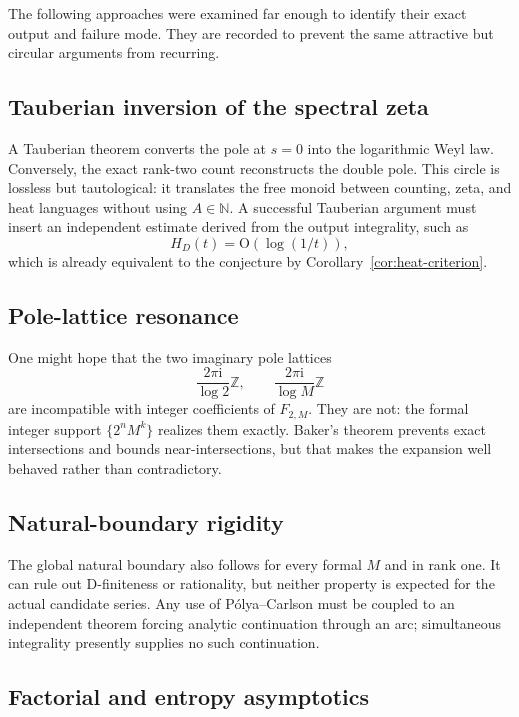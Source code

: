 \documentclass[11pt,oneside]{article}
\theoremstyle{definition}
\theoremstyle{remark}
\newcommand{\N}{\mathbb N}
\newcommand{\Z}{\mathbb Z}
\newcommand{\ii}{\mathrm i}
\newcommand{\bigO}{\mathrm O}
\begin{document}
The following approaches were examined far enough to identify their exact output and failure mode.  They are recorded to prevent the same attractive but circular arguments from recurring.

\subsection{Tauberian inversion of the spectral zeta}

A Tauberian theorem converts the pole at $s=0$ into the logarithmic Weyl law.  Conversely, the exact rank-two count reconstructs the double pole.  This circle is lossless but tautological: it translates the free monoid between counting, zeta, and heat languages without using $A\in\N$.  A successful Tauberian argument must insert an independent estimate derived from the output integrality, such as
\[
  H_D(t)=\bigO(\log(1/t)),
\]
which is already equivalent to the conjecture by Corollary~\ref{cor:heat-criterion}.

\subsection{Pole-lattice resonance}

One might hope that the two imaginary pole lattices
\[
  \frac{2\pi\ii}{\log2}\Z,
  \qquad
  \frac{2\pi\ii}{\log M}\Z
\]
are incompatible with integer coefficients of $F_{2,M}$.  They are not: the formal integer support $\{2^nM^k\}$ realizes them exactly.  Baker's theorem prevents exact intersections and bounds near-intersections, but that makes the expansion well behaved rather than contradictory.

\subsection{Natural-boundary rigidity}

The global natural boundary also follows for every formal $M$ and in rank one.  It can rule out D-finiteness or rationality, but neither property is expected for the actual candidate series.  Any use of P\'olya--Carlson must be coupled to an independent theorem forcing analytic continuation through an arc; simultaneous integrality presently supplies no such continuation.

\subsection{Factorial and entropy asymptotics}
\end{document}
